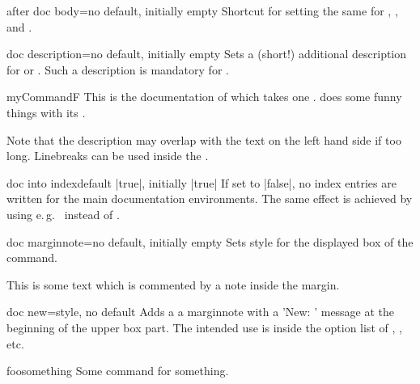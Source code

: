 \begin{docTcbKey}[][doc new=2015-10-09]{after doc body}{=}{no default, initially empty}
  Shortcut for setting the same  for
  , ,
  and .
\end{docTcbKey}


\clearpage
\begin{docTcbKey}{doc description}{=}{no default, initially empty}
  Sets a (short!) additional description  for
   or . Such a description is
  mandatory for .
\begin{dispExample}
\begin{docCommand*}[doc description=my description]{myCommandF}{}
  This is the documentation of  which takes one .
   does some funny things with its .
\end{docCommand*}
\end{dispExample}
\begin{marker}
Note that the description  may overlap with the text on the left
hand side if too long. Linebreaks can be used inside the .
\end{marker}
\end{docTcbKey}

\begin{docTcbKey}{doc into index}{}{default |true|, initially |true|}
  If set to |false|, no index entries are written for the main documentation
  environments. The same effect is achieved by using e.\,g.\ 
  instead of .
\end{docTcbKey}

\begin{docTcbKey}[][doc new=2014-09-19]{doc marginnote}{=}{no default, initially empty}
  Sets style  for the displayed box of the  command.
\begin{dispExample}
%
This is some text
which is commented by a note inside the margin.
\end{dispExample}
\end{docTcbKey}

\begin{docTcbKey}[][doc new=2014-09-19]{doc new}{=}{style, no default}
  Adds a a marginnote with a 'New: ' message at the beginning of
  the upper box part. The intended use is inside the option list of
  , , etc.
  \makeatletter\renewcommand*{\tcbdocnew}[1]{\kvtcb@text@new: #1}\makeatother%
\begin{dispExample}
\begin{docCommand}[doc new=2000-01-01]{foosomething}{}
Some command for something.
\end{docCommand}
\end{dispExample}
\end{docTcbKey}


